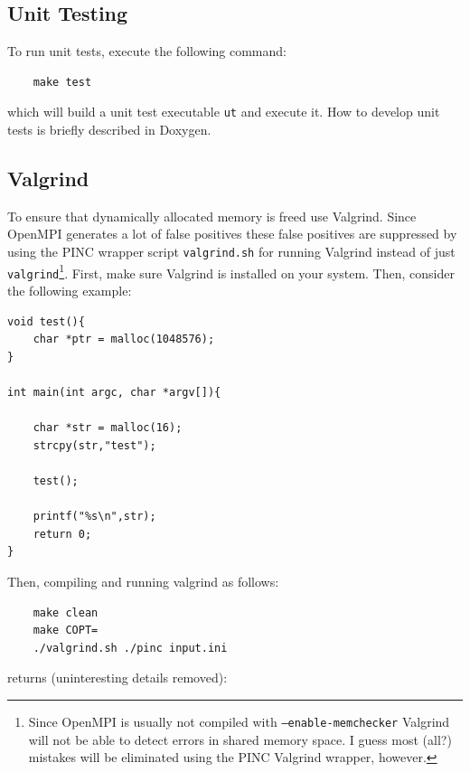 \documentclass[10pt,a4paper]{article}
\begin{document}
\subsection{Unit Testing}
To run unit tests, execute the following command:

\begin{verbatim}
	make test
\end{verbatim}
which will build a unit test executable \verb$ut$ and execute it. How to develop unit tests is briefly described in Doxygen.

\subsection{Valgrind}
To ensure that dynamically allocated memory is freed use Valgrind. Since OpenMPI generates a lot of false positives these false positives are suppressed by using the PINC wrapper script \verb$valgrind.sh$ for running Valgrind instead of just \verb$valgrind$\footnote{Since OpenMPI is usually not compiled with \texttt{--enable-memchecker} Valgrind will not be able to detect errors in shared memory space. I guess most (all?) mistakes will be eliminated using the PINC Valgrind wrapper, however.}. First, make sure Valgrind is installed on your system. Then, consider the following example:

\begin{lstlisting}
void test(){
	char *ptr = malloc(1048576);
}

int main(int argc, char *argv[]){

	char *str = malloc(16);
	strcpy(str,"test");
	
	test();

	printf("%s\n",str);
	return 0;
}
\end{lstlisting}
Then, compiling and running valgrind as follows:

\begin{verbatim}
	make clean
	make COPT=
	./valgrind.sh ./pinc input.ini
\end{verbatim}
returns (uninteresting details removed):
\end{document}
